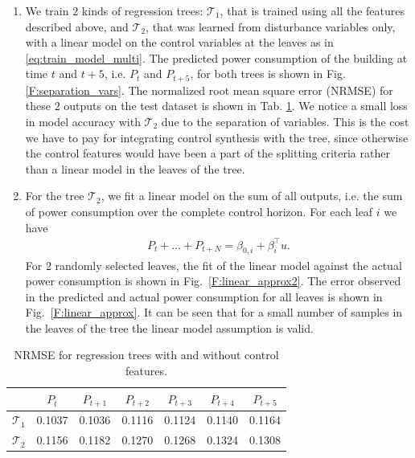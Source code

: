 \begin{enumerate}[leftmargin=1cm]
\item We train $2$ kinds of regression trees: $\mathcal{T}_1$, that is trained using all the features described above, and $\mathcal{T}_2$, that was learned from disturbance variables only, with a linear model on the control variables at the leaves as in \eqref{eq:train_model_multi}.
The predicted power consumption of the building at time $t$ and $t+5$, i.e. $P_t$ and $P_{t+5}$, for both trees is shown in Fig. \ref{F:separation_vars}. 
The normalized root mean square error (NRMSE) for these $2$ outputs on the test dataset is shown in Tab. \ref{T:NMRSE_separation_vars}. 
We notice a small loss in model accuracy with $\mathcal{T}_2$ due to the separation of variables.
This is the cost we have to pay for integrating control synthesis with the tree, since otherwise the control features would have been a part of the splitting criteria rather than a linear model in the leaves of the tree.
\item For the tree $\mathcal{T}_2$, we fit a linear model on the sum of all outputs, i.e. the sum of power consumption over the complete control horizon. For each leaf $i$ we have
\begin{gather}
P_t+ \dots + P_{t+N}  = \beta_{0,i} + \beta_i^\top u.
\end{gather}
For $2$ randomly selected leaves, the fit of the linear model against the actual power consumption is shown in Fig.~\ref{F:linear_approx2}. 
The error observed in the predicted and actual power consumption for all leaves is shown in Fig.~\ref{F:linear_approx}. 
It can be seen that for a small number of samples in the leaves of the tree the linear model assumption is valid.
\end{enumerate}

\begin{table}
	\centering
	\caption{NRMSE for regression trees with and without control features.}
	\begin{tabular}{c|c|c|c|c|c|c}
		\toprule
		& $P_t$ &$P_{t+1}$ &$P_{t+2}$ &$P_{t+3}$ &$P_{t+4}$ & $P_{t+5}$ \\
		\midrule
		$\mathcal{T}_1$     & 0.1037  &  0.1036 &   0.1116 &   0.1124 &   0.1140  &  0.1164  \\
		$\mathcal{T}_2$     & 0.1156  &  0.1182 &   0.1270 &   0.1268 &   0.1324  &  0.1308  \\
		\bottomrule
	\end{tabular}
	\label{T:NMRSE_separation_vars}
\end{table}

